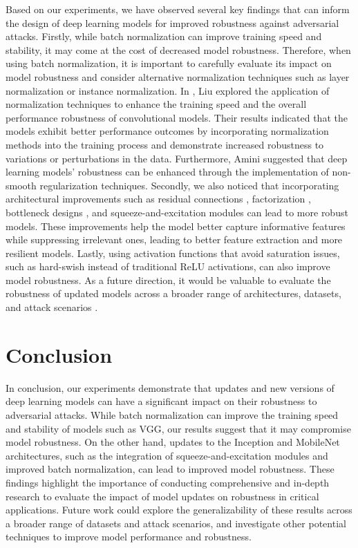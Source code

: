 Based on our experiments, we have observed several key findings that can inform the design of deep learning models for improved robustness against adversarial attacks.
Firstly, while batch normalization can improve training speed and stability, it may come at the cost of decreased model robustness. Therefore, when using batch normalization, it is important to carefully evaluate its impact on model robustness and consider alternative normalization techniques such as layer normalization or instance normalization. In \cite{liu2021convolutional}, Liu \etal explored the application of normalization techniques to enhance the training speed and the overall performance robustness of convolutional models. Their results indicated that the models exhibit better performance outcomes by incorporating normalization methods into the training process and demonstrate increased robustness to variations or perturbations in the data. Furthermore, Amini \etal \cite{8970483} suggested that deep learning models' robustness can be enhanced through the implementation of non-smooth regularization techniques.
Secondly, we also noticed that incorporating architectural improvements such as residual connections \cite{he2016deep}, factorization \cite{wang2017factorized}, bottleneck designs \cite{he2016deep}, and squeeze-and-excitation modules \cite{hu2018squeeze} can lead to more robust models. These improvements help the model better capture informative features while suppressing irrelevant ones, leading to better feature extraction and more resilient models. 
Lastly, using activation functions that avoid saturation issues, such as hard-swish instead of traditional ReLU activations, can also improve model robustness.
As a future direction, it would be valuable to evaluate the robustness of updated models across a broader range of architectures, datasets, and attack scenarios \cite{abdukhamidov2022black, abdukhamidov2021advedge,abdukhamidov2022interpretations}. 

\section{Conclusion}
\label{sec:conclusion}

In conclusion, our experiments demonstrate that updates and new versions of deep learning models can have a significant impact on their robustness to adversarial attacks. While batch normalization can improve the training speed and stability of models such as VGG, our results suggest that it may compromise model robustness. On the other hand, updates to the Inception and MobileNet architectures, such as the integration of squeeze-and-excitation modules and improved batch normalization, can lead to improved model robustness. These findings highlight the importance of conducting comprehensive and in-depth research to evaluate the impact of model updates on robustness in critical applications. Future work could explore the generalizability of these results across a broader range of datasets and attack scenarios, and investigate other potential techniques to improve model performance and robustness. 
